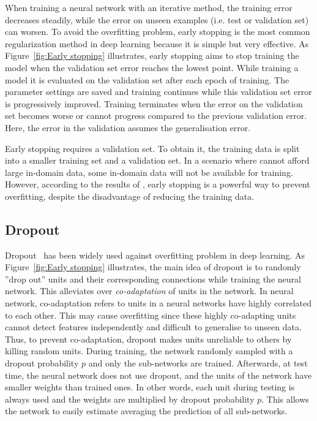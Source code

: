 When training a neural network with an iterative method, the training error decreases steadily, while the error on unseen examples (i.e. test or validation set) can worsen. To avoid the overfitting problem, early stopping is the most common regularization method in deep learning because it is simple but very effective. As Figure~\ref{fig:Early stopping} illustrates, early stopping aims to stop training the model when the validation set error reaches the lowest point. While training a model it is evaluated on the validation set after each epoch of training. The parameter settings are saved and training continues while this validation set error is progressively improved. Training terminates when the error on the validation set becomes worse or cannot progress compared to the previous validation error. Here, the error in the validation assumes the generalisation error.  

Early stopping requires a validation set. To obtain it, the training data is split into a smaller training set and a validation set. In a scenario where cannot afford large in-domain data, some in-domain data will not be available for training. However, according to the results of \cite{miceli-barone-etal-2017-regularization}, early stopping is a powerful way to prevent overfitting, despite the disadvantage of reducing the training data.

\subsection{Dropout}


Dropout~\parencite{srivastava2014dropout} has been widely used against overfitting problem in deep learning. As Figure~\ref{fig:Early stopping} illustrates, the main idea of dropout is to randomly ''drop out'' units and their corresponding connections while training the neural network. This alleviates over \textit{co-adaptation} of units in the network. In neural network, co-adaptation refers to units in a neural networks have highly correlated to each other. This may cause overfitting since these highly co-adapting units cannot detect features independently and difficult to generalise to unseen data. Thus, to prevent co-adaptation, dropout makes units unreliable to others by killing random units. During training, the network randomly sampled with a dropout probability $p$ and only the sub-networks are trained. Afterwards, at test time, the neural network does not use dropout, and the units of the network have smaller weights than trained ones. In other words, each unit during testing is always used and the weights are multiplied by dropout probability $p$. This allows the network to easily estimate averaging the prediction of all sub-networks.

